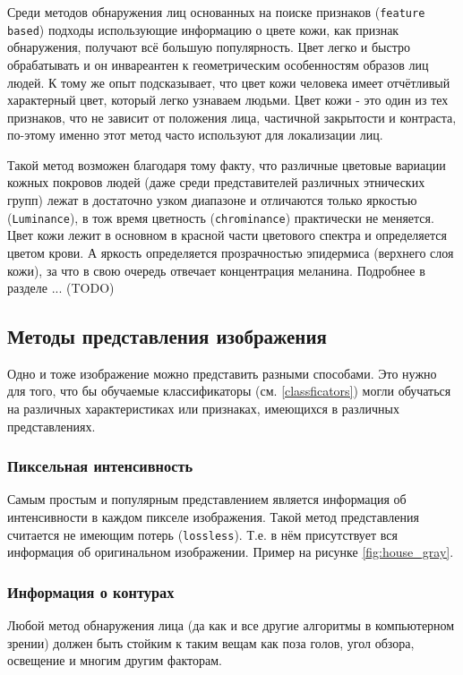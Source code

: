 \documentclass[12pt]{report}
\begin{document}
Среди методов обнаружения лиц основанных на поиске признаков (\texttt{feature based}) подходы использующие информацию о цвете кожи, как признак обнаружения, получают всё большую популярность. Цвет легко и быстро обрабатывать и он инвареантен к геометрическим особенностям образов лиц людей. К тому же опыт подсказывает, что цвет кожи человека имеет отчётливый характерный цвет, который легко узнаваем людьми. \citep{vezhnevets2003survey} Цвет кожи - это один из тех признаков, что не зависит от положения лица, частичной закрытости и контраста, по-этому именно этот метод часто используют для локализации лиц. \citep{ruangyam2009efficient}

Такой метод возможен благодаря тому факту, что различные цветовые вариации кожных покровов людей (даже среди представителей различных этнических групп) лежат в достаточно узком диапазоне и отличаются только яркостью (\texttt{Luminance}), в тож время цветность (\texttt{chrominance}) практически не меняется. Цвет кожи лежит в основном в красной части цветового спектра и определяется цветом крови. А яркость определяется прозрачностью эпидермиса (верхнего слоя кожи), за что в свою очередь отвечает концентрация меланина. \citep{xu2006color} Подробнее в разделе ... (TODO)

\subsection{Методы представления изображения}
Одно и тоже изображение можно представить разными способами. Это нужно для того, что бы обучаемые классификаторы (см. \ref{classficators}) могли обучаться на различных характеристиках или признаках, имеющихся в различных представлениях. 

\subsubsection{Пиксельная интенсивность}
Самым простым и популярным представлением является информация об интенсивности в каждом пикселе изображения. Такой метод представления считается не имеющим потерь (\texttt{lossless}). Т.е. в нём присутствует  вся информация об оригинальном изображении.\citep{bojkovic2006face} Пример на рисунке \ref{fig:house_gray}.

\subsubsection{Информация о контурах}
Любой метод обнаружения лица (да как и все другие алгоритмы в компьютерном зрении) должен быть стойким к таким вещам как поза голов, угол обзора, освещение и многим другим факторам. 
\end{document}

